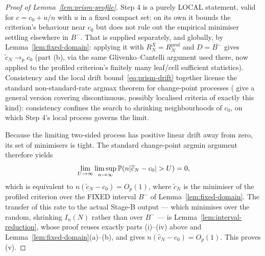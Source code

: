 \documentclass[11pt]{article}
\theoremstyle{plain}
\theoremstyle{definition}
\theoremstyle{remark}
\newcommand{\PP}{\mathbb{P}}
\DeclarePairedDelimiter{\abs}{\lvert}{\rvert}
\begin{document}
\begin{proof}[Proof of Lemma~\ref{lem:prism-profile}]
Step 4 is a purely LOCAL statement, valid for \(c=c_0+u/n\) with \(u\) in a
fixed compact set: on its own it bounds the criterion's behaviour near
\(c_0\) but does not rule out the empirical minimiser settling elsewhere in
\(B^-\).  That is supplied separately, and globally, by
Lemma~\ref{lem:fixed-domain}: applying it with \(R_N^X=R_N^{\mathrm
{prof}}\) and \(D=\overline{B^-}\) gives \(\widetilde c_N\to_pc_0\) (part (b),
via the same
Glivenko--Cantelli argument used there, now applied to the profiled
criterion's finitely many leaf/cell sufficient statistics). Consistency and
the local drift bound~\eqref{eq:prism-drift} together license the standard
non-standard-rate argmax theorem for change-point processes
(\citealt{seootsu2018} give a general version covering discontinuous,
possibly localised criteria of exactly this kind): consistency confines the
search to shrinking neighbourhoods of \(c_0\), on which Step 4's local
process governs the limit.

Because the limiting two-sided process has positive linear drift away from
zero, its set of minimisers is tight.  The standard change-point argmin
argument therefore yields
\[
  \lim_{U\to\infty}\limsup_{n\to\infty}
  \PP\!\left(n\abs{\widetilde c_N-c_0}>U\right)=0,
\]
which is equivalent to
\(n(\widetilde c_N-c_0)=O_p(1)\), where \(\widetilde c_N\) is the minimiser
of the profiled criterion over the FIXED interval \(B^-\) of
Lemma~\ref{lem:fixed-domain}.  The transfer of this rate to the actual
Stage-B output --- which minimises over the random, shrinking \(I_n(N)\)
rather than over \(B^-\) --- is Lemma~\ref{lem:interval-reduction}, whose
proof reuses exactly parts (i)--(iv) above and
Lemma~\ref{lem:fixed-domain}(a)--(b), and gives
\(n(\widehat c_N-c_0)=O_p(1)\).  This proves (v).
\end{proof}
\end{document}
